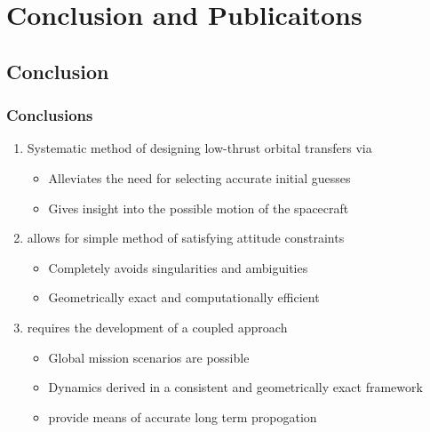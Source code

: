 

\section[Conclusion]{Conclusion and Publicaitons}
\subsection*{Conclusion}

\begin{frame} %
\frametitle{Conclusions}
  \begin{enumerate}
    \item<1-> Systematic method of designing low-thrust orbital transfers via 
    \begin{itemize}
        \item Alleviates the need for selecting accurate initial guesses 
        \item Gives insight into the possible motion of the spacecraft
    \end{itemize}
    \item<2->  allows for simple method of satisfying attitude constraints
    \begin{itemize}
        \item Completely avoids singularities and ambiguities
        \item Geometrically exact and computationally efficient
    \end{itemize}
    \item<3->  requires the development of a coupled approach 
    \begin{itemize}
        \item Global mission scenarios are possible
        \item Dynamics derived in a consistent and geometrically exact framework
        \item {} provide means of accurate long term propogation
    \end{itemize}

  \end{enumerate}
\end{frame}   %


